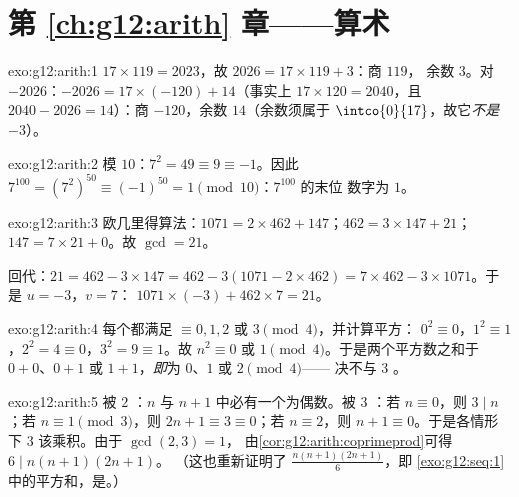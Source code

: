 \section*{第 \ref{ch:g12:arith} 章——算术}

\begin{solution}{exo:g12:arith:1}
$17 \times 119 = 2023$，故 $2026 = 17 \times 119 + 3$：商 $119$，
余数 $3$。对 $-2026$：$-2026 = 17\times(-120) + 14$（事实上
$17 \times 120 = 2040$，且 $2040 - 2026 = 14$）：商 $-120$，余数
$14$（余数须属于 $\intco{0}{17}$，故它\emph{不是} $-3$）。
\end{solution}

\begin{solution}{exo:g12:arith:2}
模 $10$：$7^2 = 49 \equiv 9 \equiv -1$。因此
$7^{100} = \left(7^2\right)^{50} \equiv (-1)^{50} = 1 \pmod{10}$：$7^{100}$ 的末位
数字为 $1$。
\end{solution}

\begin{solution}{exo:g12:arith:3}
欧几里得算法：$1071 = 2\times462 + 147$；$462 = 3\times147 + 21$；
$147 = 7\times21 + 0$。故 $\gcd = 21$。

回代：$21 = 462 - 3\times147 = 462 - 3(1071 - 2\times462)
= 7\times462 - 3\times1071$。于是 $u = -3$，$v = 7$：
$1071\times(-3) + 462\times7 = 21$。
\end{solution}

\begin{solution}{exo:g12:arith:4}
每个都满足 $\equiv 0, 1, 2$ 或 $3 \pmod 4$，并计算平方：
$0^2 \equiv 0$，$1^2 \equiv 1$，$2^2 = 4 \equiv 0$，$3^2 = 9 \equiv 1$。故
$n^2 \equiv 0$ 或 $1 \pmod 4$。于是两个平方数之和于
$0 + 0$、$0 + 1$ 或 $1 + 1$，\emph{即}为 $0$、$1$ 或 $2 \pmod 4$——
决不与 $3$ 。
\end{solution}

\begin{solution}{exo:g12:arith:5}
被 $2$ ：$n$ 与 $n + 1$ 中必有一个为偶数。被
$3$ ：若 $n \equiv 0$，则 $3 \mid n$；若 $n \equiv 1 \pmod 3$，则
$2n + 1 \equiv 3 \equiv 0$；若 $n \equiv 2$，则 $n + 1 \equiv 0$。于是各情形下
$3$ 该乘积。由于 $\gcd(2,3) = 1$，
由\cref{cor:g12:arith:coprimeprod}可得 $6 \mid n(n+1)(2n+1)$。
（这也重新证明了 $\frac{n(n+1)(2n+1)}{6}$，即
\cref{exo:g12:seq:1}中的平方和，是。）
\end{solution}

